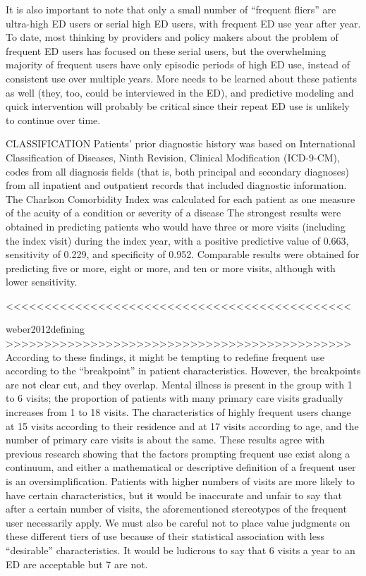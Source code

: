 It is also important to note that only a small number of “frequent fliers” are ultra-high ED users or serial high ED users, with frequent ED use year after year. To date, most thinking by providers and policy makers about the problem of frequent ED users has focused on these serial users, but the overwhelming majority of frequent users have only episodic periods of high ED use, instead of consistent use over multiple years. More needs to be learned about these patients as well (they, too, could be interviewed in the ED), and predictive modeling and quick intervention will probably be critical since their repeat ED use is unlikely to continue over time.

CLASSIFICATION
Patients' prior diagnostic history was based on International Classification of Diseases, Ninth Revision, Clinical Modification (ICD-9-CM), codes from all diagnosis fields (that is, both principal and secondary diagnoses) from all inpatient and outpatient records that included diagnostic information. The Charlson Comorbidity Index was calculated for each patient as one measure of the acuity of a condition or severity of a disease
The strongest results were obtained in predicting patients who would have three or more visits (including the index visit) during the index year, with a positive predictive value of 0.663, sensitivity of 0.229, and specificity of 0.952. Comparable results were obtained for predicting five or more, eight or more, and ten or more visits, although with lower sensitivity.

<<<<<<<<<<<<<<<<<<<<<<<<<<<<<<<<<<<<<<<<<<<<<



weber2012defining
>>>>>>>>>>>>>>>>>>>>>>>>>>>>>>>>>>>>>>>>>>>>>
According to these findings, it might be tempting to redefine frequent use according to the “breakpoint” in patient characteristics. However, the breakpoints are not clear cut, and they overlap. Mental illness is present in the group with 1 to 6 visits; the proportion of patients with many primary care visits gradually increases from 1 to 18 visits. The characteristics of highly frequent users change at 15 visits according to their residence and at 17 visits according to age, and the number of primary care visits is about the same. These results agree with previous research showing that the factors prompting frequent use exist along a continuum, and either a mathematical or descriptive definition of a frequent user is an oversimplification. Patients with higher numbers of visits are more likely to have certain characteristics, but it would be inaccurate and unfair to say that after a certain number of visits, the aforementioned stereotypes of the frequent user necessarily apply. We must also be careful not to place value judgments on these different tiers of use because of their statistical association with less “desirable” characteristics. It would be ludicrous to say that 6 visits a year to an ED are acceptable but 7 are not.

